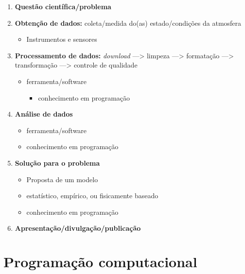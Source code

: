 \documentclass[]{book}
\providecommand{\tightlist}{%
  \setlength{\itemsep}{0pt}\setlength{\parskip}{0pt}}
\begin{document}
\begin{enumerate}
\def\labelenumi{\arabic{enumi}.}
\tightlist
\item
  \textbf{Questão científica/problema} 
\item
  \textbf{Obtenção de dados:} coleta/medida do(as) estado/condições da
  atmosfera

  \begin{itemize}
  \tightlist
  \item
    Instrumentos e sensores 
  \end{itemize}
\item
  \textbf{Processamento de dados:} \emph{download} ---\textgreater{}
  limpeza ---\textgreater{} formatação ---\textgreater{} transformação
  ---\textgreater{} controle de qualidade

  \begin{itemize}
  \tightlist
  \item
    ferramenta/software

    \begin{itemize}
    \tightlist
    \item
      {conhecimento em programação}
    \end{itemize}
  \end{itemize}
\item
  \textbf{Análise de dados}

  \begin{itemize}
  \tightlist
  \item
    ferramenta/software
  \item
    {conhecimento em programação}
  \end{itemize}
\item
  \textbf{Solução para o problema}

  \begin{itemize}
  \tightlist
  \item
    Proposta de um modelo
  \item
    estatístico, empírico, ou fisicamente baseado
  \item
    {conhecimento em programação} 
  \end{itemize}
\item
  \textbf{Apresentação/divulgação/publicação}
\end{enumerate}

\section{Programação computacional}\label{programacao-computacional}
\end{document}
